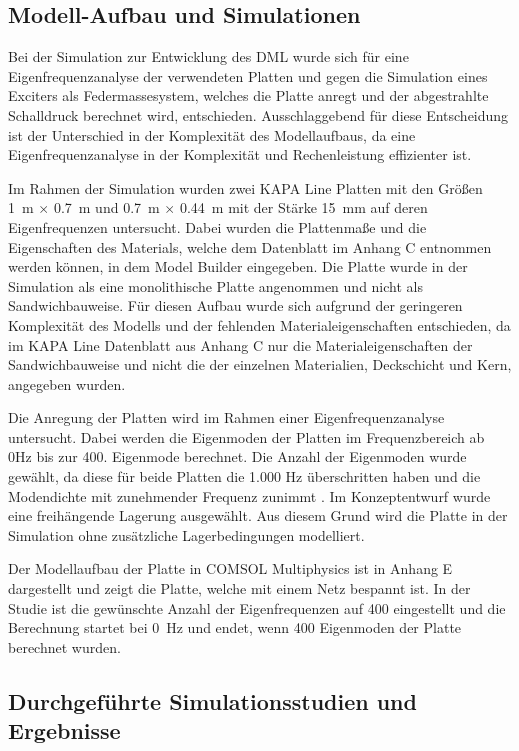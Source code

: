 \subsection{Modell-Aufbau und Simulationen}

Bei der Simulation zur Entwicklung des DML wurde sich für eine Eigenfrequenzanalyse der verwendeten Platten und gegen die Simulation eines Exciters als Federmassesystem, welches die Platte anregt und der abgestrahlte Schalldruck berechnet wird, entschieden. Ausschlaggebend für diese Entscheidung ist der Unterschied in der Komplexität des Modellaufbaus, da eine Eigenfrequenzanalyse in der Komplexität und Rechenleistung effizienter ist.

Im Rahmen der Simulation wurden zwei KAPA Line Platten mit den Größen \SI{1}{\meter} $\times$ \SI{0,7}{\meter} und \SI{0,7}{\meter} $\times$ \SI{0,44}{\meter} mit der Stärke \SI{15}{\milli\meter} auf deren Eigenfrequenzen untersucht. Dabei wurden die Plattenmaße und die Eigenschaften des Materials, welche dem Datenblatt im Anhang C entnommen werden können, in dem Model Builder eingegeben. Die Platte wurde in der Simulation als eine monolithische Platte angenommen und nicht als Sandwichbauweise. Für diesen Aufbau wurde sich aufgrund der geringeren Komplexität des Modells und der fehlenden Materialeigenschaften entschieden, da im KAPA Line Datenblatt aus Anhang C nur die Materialeigenschaften der Sandwichbauweise und nicht die der einzelnen Materialien, Deckschicht und Kern, angegeben wurden.

Die Anregung der Platten wird im Rahmen einer Eigenfrequenzanalyse untersucht. Dabei werden die Eigenmoden der Platten im Frequenzbereich ab 0Hz bis zur 400. Eigenmode berechnet. Die Anzahl der Eigenmoden wurde gewählt, da diese für beide Platten die 1.000 Hz überschritten haben und die Modendichte mit zunehmender Frequenz zunimmt \cite{Cremer1996}. Im Konzeptentwurf wurde eine freihängende Lagerung ausgewählt. Aus diesem Grund wird die Platte in der Simulation ohne zusätzliche Lagerbedingungen modelliert.

Der Modellaufbau der Platte in COMSOL Multiphysics ist in Anhang E dargestellt und zeigt die Platte, welche mit einem Netz bespannt ist. In der Studie ist die gewünschte Anzahl der Eigenfrequenzen auf 400 eingestellt und die Berechnung startet bei \SI{0}{\hertz} und endet, wenn 400 Eigenmoden der Platte berechnet wurden. 


\subsection{Durchgeführte Simulationsstudien und Ergebnisse}

